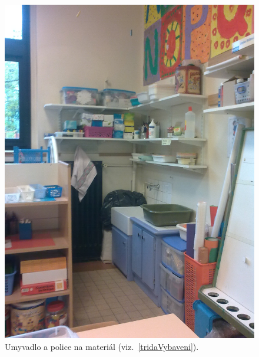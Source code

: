 	\begin{figure}[tb]
		\centering
		\includegraphics[height = 0.35\textheight]{./fotky/Obr4.jpg}
		\caption{
			Umyvadlo a police na materiál (viz.~\ref{tridaVybaveni}).
		}
		\label{Obr4}
	\end{figure}

